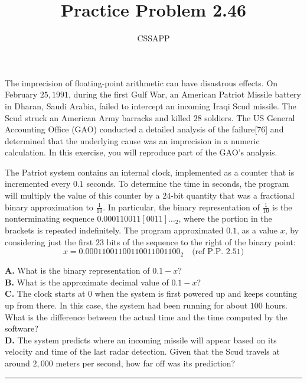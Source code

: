 \documentclass{article}
\title{Practice Problem 2.46}
\author{CSSAPP}
\begin{document}
\maketitle

\begin{flushleft}

    The imprecision of floating-point arithmetic can have disastrous effects.
    On February $25, 1991$, during the first Gulf War, an American Patriot Missile battery in
    Dharan, Saudi Arabia, failed to intercept an incoming Iraqi Scud missile. The Scud struck an
    American Army barracks and killed $28$ soldiers. The US General Accounting Office (GAO)
    conducted a detailed analysis of the failure[76] and determined that the underlying cause was
    an imprecision in a numeric calculation. In this exercise, you will reproduce part of the
    GAO's analysis.

    \noindent The Patriot system contains an internal clock, implemented as a counter that is
    incremented every $0.1$ seconds. To determine the time in seconds, the program will multiply
    the value of this counter by a $24$-bit quantity that was a fractional binary approximation to
    $\frac{1}{10}$. In particular, the binary representation of $\frac{1}{10}$ is the
    nonterminating sequence $0.000110011[0011]\ldots_2$, where the portion in the brackets is
    repeated indefinitely. The program approximated $0.1$, as a value $x$, by considering just the
    first $23$ bits of the sequence to the right of the binary point:
    \[
        x = 0.00011001100110011001100_2 \quad \text{(ref P.P.\ 2.51)}
    \]

    \smallbreak
    \noindent \textbf{A.} What is the binary representation of $0.1 - x$?\\
    \noindent \textbf{B.} What is the approximate decimal value of $0.1 - x$?\\
    \noindent \textbf{C.} The clock starts at $0$ when the system is first powered up and keeps
    counting up from there. In this case, the system had been running for about $100$ hours.
    What is the difference between the actual time and the time computed by the software?\\
    \noindent \textbf{D.} The system predicts where an incoming missile will appear based on its
    velocity and time of the last radar detection. Given that the Scud travels at around $2{,}000$
    meters per second, how far off was its prediction?

    \bigskip
    \hrule
    \bigskip


\end{flushleft}
\end{document}
